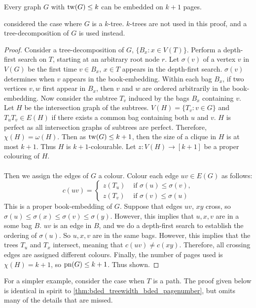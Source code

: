\begin{theorem}\label{thm:bded_treewidth_bded_pagenumber}
	Every graph \(G\) with \(\operatorname{tw}(G) \leq k\) can be embedded on $k + 1$ pages.
\end{theorem}
\textcite{ganleyPagenumberTrees2001} considered the case where \(G\) is a \(k\)-tree. $k$-trees are not used in this proof, and a tree-decomposition of \(G\) is used instead. 

\begin{proof}
	Consider a tree-decomposition of \(G\), $\{B_x: x \in V(T)\}$. Perform a depth-first search on \(T\), starting at an arbitrary root node \(r\). Let \(\sigma(v)\) of a vertex \(v\) in \(V(G)\) be the first time \(v \in B_x\), $x \in T$ appears in the depth-first search. $\sigma(v)$ determines when $v$ appears in the book-embedding. Within each bag $B_x$, if two vertices $v,w$ first appear in $B_x$, then $v$ and $w$ are ordered arbitrarily in the book-embedding. Now consider the subtree \(T_v\) induced by the bags \(B_x\) containing \(v\). Let \(H\) be the intersection graph of the subtrees. \(V(H) = \lbrace T_v : v \in G \rbrace\) and \(T_u T_v \in E(H)\) if there exists a common bag containing both $u$ and $v$. \(H\) is perfect as all intersection graphs of subtrees are perfect. Therefore, \(\chi(H) = \omega(H)\). Then as \(\operatorname{tw}(G) \leq k + 1\), then the size of a clique in \(H\) is at most \(k + 1\). Thus \(H\) is \(k + 1\)-colourable. Let $z: V(H) \rightarrow [k + 1]$ be a proper colouring of $H$. 
	\paragraph{}
	Then we assign the edges of \(G\) a colour. Colour each edge \(uv \in E(G)\) as follows:
	\begin{equation}
		c(uv) =
		\begin{cases}
			z(T_u) & \text{ if } \sigma(u) \leq \sigma(v), \\
			z(T_v) & \text{ if } \sigma(v) \leq \sigma(u)
		\end{cases}
	\end{equation}
	This is a proper book-embedding of \(G\). Suppose that edges \(uv\), \(xy\) cross, so \(\sigma(u) \leq \sigma(x) \leq \sigma(v) \leq \sigma(y)\). However, this implies that $u,x,v$ are in a some bag $B$. \(uv\) is an edge in \(B\), and we do a depth-first search to establish the ordering of $\sigma(u)$. So \(u, x, v\) are in the same bags. However, this implies that the trees \(T_u\) and \(T_x\) intersect, meaning that \(c(uv) \neq c(xy)\). Therefore, all crossing edges are assigned different colours. Finally, the number of pages used is \(\chi(H) = k + 1\), so \(\operatorname{pn}(G) \leq k + 1\). Thus shown.
\end{proof}
For a simpler example, consider the case when $T$ is a path. The proof given below is identical in spirit to \cref{thm:bded_treewidth_bded_pagenumber}, but omits many of the details that are missed. 

